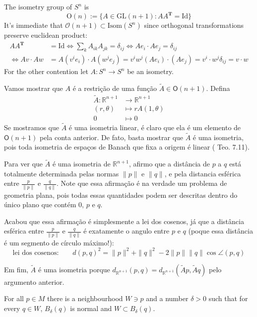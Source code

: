 \begin{example}
\label{example-isometry-group-of-Sn}
The isometry group of $S^n$ is
$$
\text{O}(n):=\{A\in\text{GL}(n+1):
AA^{\mathbf{T}}=\text{Id}\}
$$
It's immediate that $\mathcal{O}(n+1)\subset
\text{Isom}(S^n)$ since orthogonal
transformations preserve euclidean product:
$$
\begin{aligned}
A A^{\mathbf{T}}&=\text{Id}\iff \sum_k
A_{ik}A_{jk}=\delta_{ij}
\iff Ae_i\cdot Ae_j=\delta_{ij}\\
\iff Av\cdot Aw&= A\left( v^ie_i\right) \cdot
A\left( w^je_j\right)
=v^iw^j (Ae_i)\cdot (Ae_j)
=v^i\cdot w^j\delta_{ij}=v\cdot w
\end{aligned}
$$
For the other contention let $A:S^n \to S^n$
be an isometry.

Vamos mostrar que $A$ é a restrição de uma
função $\tilde{A} \in
\mathsf{O}(n+1)$. Defina
$$
\begin{aligned}
\tilde{A}: \mathbb{R}^{n+1} &\longrightarrow
\mathbb{R}^{n+1} \\
(r,\theta) &\longmapsto rA(1,\theta)\\
0&\longmapsto 0
\end{aligned}
$$
Se mostramos que $\tilde{A}$ é uma isometria
linear, é claro que ela é um
elemento de $\mathsf{O}(n+1)$ pela conta
anterior. De fato, basta mostrar que
$\tilde{A}$ é uma isometria, pois toda
isometria de espaços de Banach que fixa
a origem é linear (\cite{braga} Teo. 7.11).

Para ver que $\tilde{A}$ é uma isometria de
$\mathbb{R}^{n+1}$,
afirmo que a distância de $p$ a $q$ está
totalmente determinada
pelas normas  $\|p\|$ e $\|q\|$, e pela
distancia esférica entre
$\frac{p}{\|p\|}$ e $\frac{q}{\|q\|}$. Note
que essa afirmação é na verdade
um problema de geometria plana, pois todas
essas quantidades podem ser descritas
dentro do único plano que contém $0$, $p$ e
$q$.

Acabou que essa afirmação é simplesmente a
lei dos cosenos, já que a distância
esférica entre $\frac{p}{\|p\|}$ e
$\frac{q}{\|q\|}$ é exatamente o angulo
entre $p$ e $q$ (poque essa distância é um
segmento de círculo máximo!):
\[\text{lei dos cosenos:} \qquad
d(p,q)^2=\|p\|^2+\|q\|^2-2\|p\|\|q\| \cos
\angle(p,q) \]

Em fim, $\tilde{A}$ é uma isometria porque
$d_{\mathbb{R}^{n+1}}(p,q)=d_{\mathbb{R}^{n+
1}}(\tilde{A}p,\tilde{A}q)$
pelo
argumento anterior.
\end{example}

\begin{proposition}
\label{proposition-total-norma-neigh}
For all $p \in M$ there is a neighbourhood $W
\ni p$ and a number $\delta>0$
 such that for every $q \in W$, $B_\delta(q)$
 is normal and
 $W \subset B_\delta(q)$.
\end{proposition}

